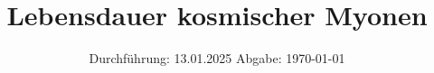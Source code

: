 
\usepackage{longtable}

\subject{V01}
\title{Lebensdauer kosmischer Myonen}
\date{%
  Durchführung: 13.01.2025
  \hspace{3em}
  Abgabe: \today
}



\maketitle
\thispagestyle{empty}
\tableofcontents
\newpage






\printbibliography{}


